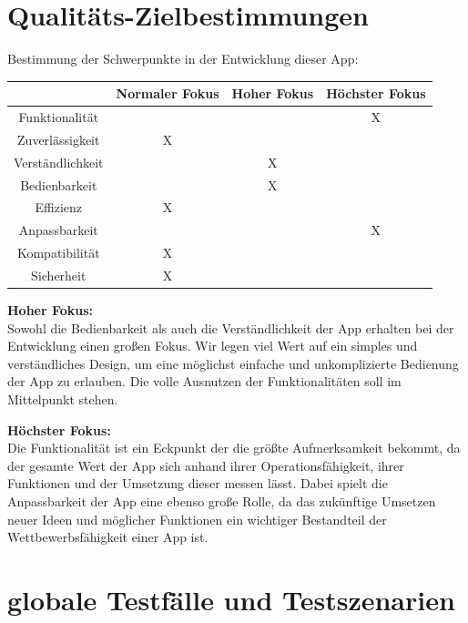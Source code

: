 \documentclass[parskip=full]{scrartcl}
\begin{document}
\newpage
\section{Qualitäts-Zielbestimmungen}
Bestimmung der Schwerpunkte in der Entwicklung dieser App:

\begin{table}[!h]
	\begin{center}
		\begin{tabular}{|c||c|c|c|}
			\hline  & Normaler Fokus & Hoher Fokus & Höchster Fokus\\
			\hline  Funktionalität & & & X \\
			\hline  Zuverlässigkeit & X & &\\
			\hline  Verständlichkeit & & X & \\
			\hline  Bedienbarkeit & & X &\\
			\hline  Effizienz & X & & \\
			\hline  Anpassbarkeit & & & X \\
			\hline  Kompatibilität & X & &\\
			\hline  Sicherheit & X & &\\
			\hline
		\end{tabular}
	\end{center}
\end{table}

\textbf{Hoher Fokus:}\\ Sowohl die Bedienbarkeit als auch die Verständlichkeit der App erhalten bei der Entwicklung einen großen Fokus. Wir legen viel Wert auf ein simples und verständliches Design, um eine möglichst einfache und unkomplizierte Bedienung der App zu erlauben. Die volle Ausnutzen der Funktionalitäten soll im Mittelpunkt stehen. %
	
\textbf{Höchster Fokus:}\\ Die Funktionalität ist ein Eckpunkt der die größte Aufmerksamkeit bekommt, da der gesamte Wert der App sich anhand ihrer Operationsfähigkeit, ihrer Funktionen und der Umsetzung dieser messen lässt. Dabei spielt die Anpassbarkeit der App eine ebenso große Rolle, da das zukünftige Umsetzen neuer Ideen und möglicher Funktionen ein wichtiger Bestandteil der Wettbewerbsfähigkeit einer App ist.


\newpage
\section{globale Testfälle und Testszenarien}
\end{document}
